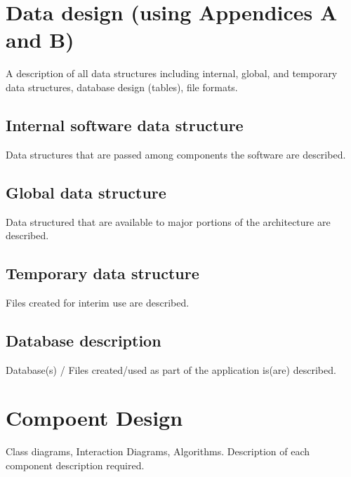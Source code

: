 \documentclass[oneside,a4paper,12pt]{report}
\begin{document}
\section{Data design (using Appendices A and B)}   
A description of all data structures including internal, global, and temporary data structures, database design (tables), file formats.
\subsection{Internal software data structure}
Data structures that are passed among components the software are described.
\subsection{Global data structure}
Data structured that are available to major portions of the architecture are described.
\subsection{Temporary data structure}
Files created for interim use are described.
\subsection{Database description}
Database(s) / Files created/used  as part of the application is(are) described.


\section{Compoent Design} 
Class diagrams, Interaction Diagrams, Algorithms. Description of each component description required.
\end{document}
